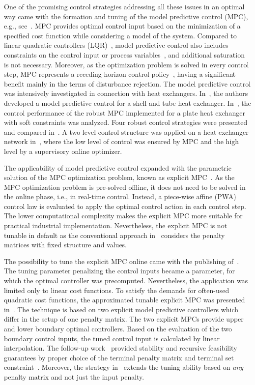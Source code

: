 \documentclass[preprint,12pt]{elsarticle}
\begin{document}
	One of the promising control strategies addressing all these issues in an optimal way came with the formation and tuning of the model predictive control (MPC), e.g., see~\cite{Morari_MPC}. MPC provides optimal control input based on the minimization of a specified cost function while considering a model of the system. Compared to linear quadratic controllers (LQR)~\cite{LQR}, model predictive control also includes constraints on the control input or process variables~\cite{Maciejowski_MPC}, and additional saturation is not necessary. Moreover, as the optimization problem is solved in every control step, MPC represents a receding horizon control policy~\cite{receding_horizon}, having a significant benefit mainly in the terms of disturbance rejection. The model predictive control was intensively investigated in connection with heat exchangers. In~\cite{Vinaya_HE_MPC}, the authors developed a model predictive control for a shell and tube heat exchanger. In~\cite{Oravec_energy}, the control performance of the robust MPC implemented for a plate heat exchanger with soft constraints was analyzed. Four robust control strategies were presented and compared in~\cite{Oravec_HE_ATE}. A two-level control structure was applied on a heat exchanger network in~\cite{Gonzales_HE_MPC}, where the low level of control was ensured by MPC and the high level by a supervisory online optimizer.       
	
	The applicability of model predictive control expanded with the parametric solution of the MPC optimization problem, known as explicit MPC~\cite{Bemporad_automatica}. As the MPC optimization problem is pre-solved offline, it does not need to be solved in the online phase, i.e., in real-time control. Instead, a piece-wise affine (PWA) control law is evaluated to apply the optimal control action in each control step. The lower computational complexity makes the explicit MPC more suitable for practical industrial implementation. Nevertheless, the explicit MPC is not tunable in default as the conventional approach in~\cite{Bemporad_automatica} considers the penalty matrices with fixed structure and values.
	
	The possibility to tune the explicit MPC online came with the publishing of~\cite{Baric_tunable}. The tuning parameter penalizing the control inputs became a parameter, for which the optimal controller was precomputed. Nevertheless, the application was limited only to linear cost functions. To satisfy the demands for often-used quadratic cost functions, the approximated tunable explicit MPC was presented in~\cite{Klauco_tunable}. The technique is based on two explicit model predictive controllers which differ in the setup of one penalty matrix. The two explicit MPCs provide upper and lower boundary optimal controllers. Based on the evaluation of the two boundary control inputs, the tuned control input is calculated by linear interpolation. The follow-up work~\cite{Oravec_tunable} provided stability and recursive feasibility guarantees by proper choice of the terminal penalty matrix and terminal set constraint~\cite{Mayne_stability}. Moreover, the strategy in~\cite{Oravec_tunable} extends the tuning ability based on \textit{any} penalty matrix and not just the input penalty.
	
\end{document}
